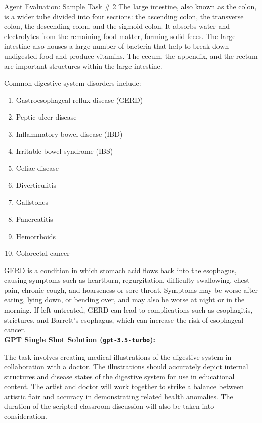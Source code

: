 \begin{AIBoxBreak}{Agent Evaluation: Sample Task \# 2}
	The large intestine, also known as the colon, is a wider tube divided into four sections: the ascending colon, the transverse colon, the descending colon, and the sigmoid colon. It absorbs water and electrolytes from the remaining food matter, forming solid feces. The large intestine also houses a large number of bacteria that help to break down undigested food and produce vitamins. The cecum, the appendix, and the rectum are important structures within the large intestine.

	Common digestive system disorders include:

	\begin{enumerate}
		\item  Gastroesophageal reflux disease (GERD)
		\item  Peptic ulcer disease
		\item  Inflammatory bowel disease (IBD)
		\item  Irritable bowel syndrome (IBS)
		\item  Celiac disease
		\item  Diverticulitis
		\item  Gallstones
		\item  Pancreatitis
		\item  Hemorrhoids
		\item  Colorectal cancer
	\end{enumerate}

	GERD is a condition in which stomach acid flows back into the esophagus, causing symptoms such as heartburn, regurgitation, difficulty swallowing, chest pain, chronic cough, and hoarseness or sore throat. Symptoms may be worse after eating, lying down, or bending over, and may also be worse at night or in the morning. If left untreated, GERD can lead to complications such as esophagitis, strictures, and Barrett's esophagus, which can increase the risk of esophageal cancer.\\


	\textbf{GPT Single Shot Solution (\texttt{gpt-3.5-turbo}):}

	The task involves creating medical illustrations of the digestive system in collaboration with a doctor. The illustrations should accurately depict internal structures and disease states of the digestive system for use in educational content. The artist and doctor will work together to strike a balance between artistic flair and accuracy in demonstrating related health anomalies. The duration of the scripted classroom discussion will also be taken into consideration.

\end{AIBoxBreak}





